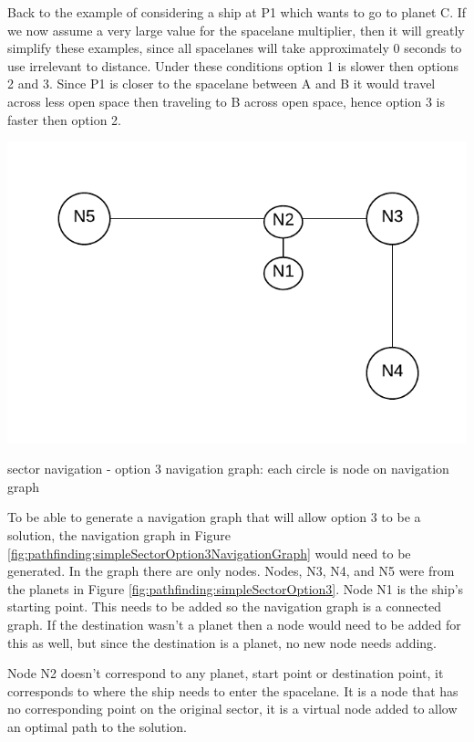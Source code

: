 Back to the example of considering a ship at P1 which wants to go to planet C.
If we now assume a very large value for the spacelane multiplier, then it will greatly simplify these examples, since all spacelanes will take approximately 0 seconds to use irrelevant to distance.
Under these conditions option 1 is slower then options 2 and 3.
Since P1 is closer to the spacelane between A and B it would travel across less open space then traveling to B across open space, hence option 3 is faster then option 2.

\begin{marginfigure}
	\includegraphics{res/pathfinding/PathFindingSectorOption3NavigationGraph.pdf}
    \caption[sector navigation - option 3 navigation graph]{sector navigation - option 3 navigation graph: each circle is node on navigation graph}
	\label{fig:pathfinding:simpleSectorOption3NavigationGraph}
\end{marginfigure}

To be able to generate a navigation graph that will allow option 3 to be a solution, the navigation graph in Figure \ref{fig:pathfinding:simpleSectorOption3NavigationGraph} would need to be generated.
In the graph there are only nodes. 
Nodes, N3, N4, and N5 were from the planets in Figure \ref{fig:pathfinding:simpleSectorOption3}.
Node N1 is the ship's starting point.
This needs to be added so the navigation graph is a connected graph.
If the destination wasn't a planet then a node would need to be added for this as well, but since the destination is a planet, no new node needs adding.

Node N2 doesn't correspond to any planet, start point or destination point, it corresponds to where the ship needs to enter the spacelane.
It is a node that has no corresponding point on the original sector, it is a virtual node added to allow an optimal path to the solution.

